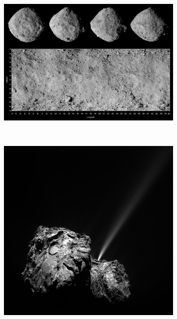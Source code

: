 \begin{figure}[htb]
    \centering
    \begin{subfigure}[b]{\textwidth}
        \centering
        \includegraphics[width=\textwidth]{doc/thesis/0_figures/procedural_terrain/2963_Bennu.png}
        \caption{}
        \label{fig:render_quali_bennu}
    \end{subfigure}
    \\
    \begin{subfigure}[b]{0.425\textwidth}
        \centering
        \includegraphics[width=\textwidth]{doc/thesis/0_figures/procedural_terrain/67P_CG.PNG}

\end{subfigure}
\end{figure}
